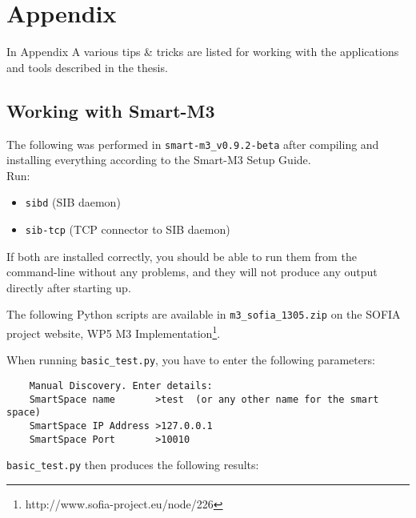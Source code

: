\chapter{Appendix}

In Appendix A various tips \& tricks are listed for working with the applications and tools described in the thesis.

\section{Working with Smart-M3}

The following was performed in \texttt{smart-m3\_v0.9.2-beta} after compiling and installing everything according to the Smart-M3 Setup Guide.\\

Run:
\begin{itemize}
	\item \texttt{sibd} (SIB daemon)
	\item \texttt{sib-tcp} (TCP connector to SIB daemon)
\end{itemize}

If both are installed correctly, you should be able to run them from the command-line without any problems, and they will not produce any output directly after starting up.

The following Python scripts are available in \texttt{m3\_sofia\_1305.zip} on the SOFIA project website, WP5 M3 Implementation\footnote{http://www.sofia-project.eu/node/226}.

When running \texttt{basic\_test.py}, you have to enter the following parameters:

\begin{verbatim}
	Manual Discovery. Enter details:
	SmartSpace name       >test  (or any other name for the smart space)
	SmartSpace IP Address >127.0.0.1                          	
	SmartSpace Port       >10010
\end{verbatim}

\texttt{basic\_test.py} then produces the following results:

